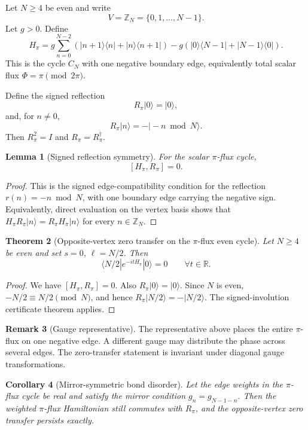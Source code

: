 \documentclass[11pt]{article}
\newtheorem{theorem}{Theorem}[section]
\newtheorem{lemma}[theorem]{Lemma}
\newtheorem{corollary}[theorem]{Corollary}
\theoremstyle{definition}
\newtheorem{remark}[theorem]{Remark}
\newcommand{\R}{\mathbb R}
\begin{document}
Let $N\ge4$ be even and write
\[
V=\mathbb Z_N=\{0,1,\ldots,N-1\}.
\]
Let $g>0$. Define
\[
H_\pi=g\sum_{n=0}^{N-2}(|n+1\rangle\langle n|+|n\rangle\langle n+1|)-g(|0\rangle\langle N-1|+|N-1\rangle\langle0|).
\]
This is the cycle $C_N$ with one negative boundary edge, equivalently total scalar flux $\Phi=\pi\pmod{2\pi}$.

Define the signed reflection
\[
R_\pi|0\rangle=|0\rangle,
\]
and, for $n\ne0$,
\[
R_\pi|n\rangle=-|-n\bmod N\rangle.
\]
Then $R_\pi^2=I$ and $R_\pi=R_\pi^\dagger$.

\begin{lemma}[Signed reflection symmetry]
For the scalar $\pi$-flux cycle,
\[
[H_\pi,R_\pi]=0.
\]
\end{lemma}

\begin{proof}
This is the signed edge-compatibility condition for the reflection $r(n)=-n\bmod N$, with one boundary edge carrying the negative sign. Equivalently, direct evaluation on the vertex basis shows that $H_\pi R_\pi|n\rangle=R_\pi H_\pi|n\rangle$ for every $n\in\mathbb Z_N$.
\end{proof}

\begin{theorem}[Opposite-vertex zero transfer on the $\pi$-flux even cycle]
Let $N\ge4$ be even and set $s=0$, $\ell=N/2$. Then
\[
\langle N/2|e^{-itH_\pi}|0\rangle=0\qquad \forall t\in\R.
\]
\end{theorem}

\begin{proof}
We have $[H_\pi,R_\pi]=0$. Also $R_\pi|0\rangle=|0\rangle$. Since $N$ is even, $-N/2\equiv N/2\pmod N$, and hence $R_\pi|N/2\rangle=-|N/2\rangle$. The signed-involution certificate theorem applies.
\end{proof}

\begin{remark}[Gauge representative]
The representative above places the entire $\pi$-flux on one negative edge. A different gauge may distribute the phase across several edges. The zero-transfer statement is invariant under diagonal gauge transformations.
\end{remark}

\begin{corollary}[Mirror-symmetric bond disorder]
Let the edge weights in the $\pi$-flux cycle be real and satisfy the mirror condition $g_n=g_{N-1-n}$. Then the weighted $\pi$-flux Hamiltonian still commutes with $R_\pi$, and the opposite-vertex zero transfer persists exactly.
\end{corollary}
\end{document}
